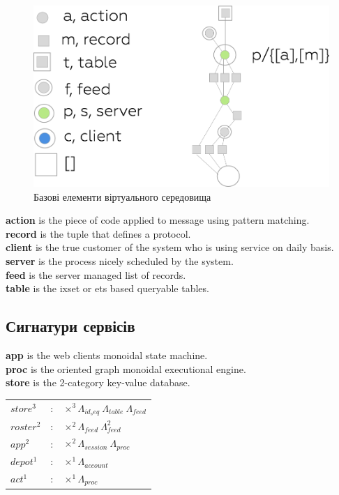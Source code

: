 \documentclass[11pt,oneside]{article}
\begin{document}
\begin{figure}[h!]
\centering
\includegraphics[scale=0.3]{img/exe-legend}
\caption{Базові елементи віртуального середовища}
\end{figure}

{\bf action} is the piece of code applied to message using pattern matching.\\
{\bf record} is the tuple that defines a protocol.\\
{\bf client} is the true customer of the system who is using service on daily basis.\\
{\bf server} is the process nicely scheduled by the system.\\
{\bf feed} is the server managed list of records.\\
{\bf table} is the ixset or ets based queryable tables.\\

\subsection*{Сигнатури сервісів}

{\bf app} is the web clients monoidal state machine.\\
{\bf proc} is the oriented graph monoidal executional engine.\\
{\bf store} is the 2-category key-value database.\\

\begin{center}
\begin{tabular}{lll}
           $store^3$ &:& $\times^3 \Lambda_{id_seq}\ \Lambda_{table}\ \Lambda_{feed}$ \\
          $roster^2$ &:& $\times^2 \Lambda_{feed}\ \Lambda^2_{feed}$ \\
             $app^2$ &:& $\times^2 \Lambda_{session}\ \Lambda_{proc}$ \\
           $depot^1$ &:& $\times^1 \Lambda_{account}$ \\
             $act^1$ &:& $\times^1 \Lambda_{proc}$ \\
\end{tabular}
\end{center}
\end{document}

